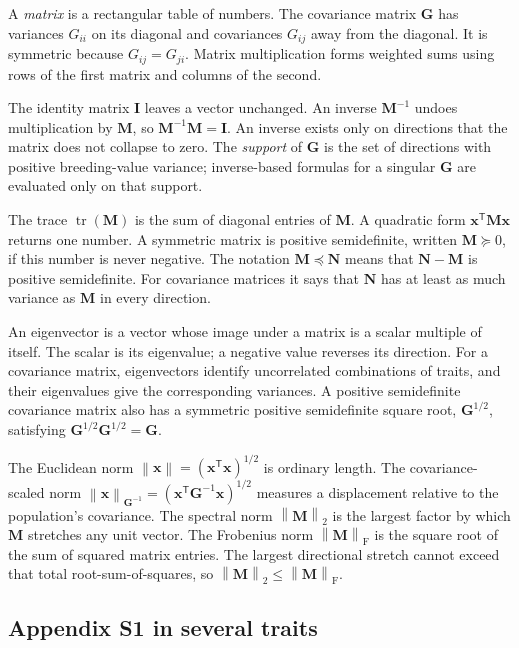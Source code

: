 \documentclass[11pt]{article}
\newcommand{\vect}[1]{\boldsymbol{#1}}
\newcommand{\mat}[1]{\mathbf{#1}}
\newcommand{\tr}{\operatorname{tr}}
\newcommand{\norm}[1]{\left\lVert#1\right\rVert}
\begin{document}
A \emph{matrix} is a rectangular table of numbers.  The covariance matrix
$\mat G$ has variances $G_{ii}$ on its diagonal and covariances $G_{ij}$ away
from the diagonal.  It is symmetric because $G_{ij}=G_{ji}$.  Matrix
multiplication forms weighted sums using rows of the first matrix and columns
of the second.

The identity matrix $\mat I$ leaves a vector unchanged.  An inverse
$\mat M^{-1}$ undoes multiplication by $\mat M$, so
$\mat M^{-1}\mat M=\mat I$.  An inverse exists only on directions that the
matrix does not collapse to zero.  The \emph{support} of $\mat G$ is the set
of directions with positive breeding-value variance; inverse-based formulas
for a singular $\mat G$ are evaluated only on that support.

The trace $\tr(\mat M)$ is the sum of diagonal entries of $\mat M$.  A
quadratic form $\vect x^{\mathsf T}\mat M\vect x$ returns one number.  A
symmetric matrix is positive semidefinite, written $\mat M\succeq0$, if this
number is never negative.  The notation $\mat M\preceq\mat N$ means that
$\mat N-\mat M$ is positive semidefinite.  For covariance matrices it says
that $\mat N$ has at least as much variance as $\mat M$ in every direction.

An eigenvector is a vector whose image under a matrix is a scalar multiple of itself. The scalar is its eigenvalue; a negative value reverses its direction. For a covariance matrix, eigenvectors identify uncorrelated combinations of traits, and their eigenvalues give the corresponding variances. A positive semidefinite covariance matrix also has a symmetric positive semidefinite square root, $\mat G^{1/2}$, satisfying $\mat G^{1/2}\mat G^{1/2}=\mat G$.

The Euclidean norm $\norm{\vect x}=(\vect x^{\mathsf T}\vect x)^{1/2}$ is
ordinary length.  The covariance-scaled norm
$\norm{\vect x}_{\mat G^{-1}}=(\vect x^{\mathsf T}\mat G^{-1}\vect x)^{1/2}$
measures a displacement relative to the population's covariance.  The
spectral norm $\norm{\mat M}_2$ is the largest factor by which $\mat M$
stretches any unit vector.  The Frobenius norm
$\norm{\mat M}_{\mathrm F}$ is the square root of the sum of squared matrix
entries.  The largest directional stretch cannot exceed that total
root-sum-of-squares, so $\norm{\mat M}_2\leq\norm{\mat M}_{\mathrm F}$.

\subsection{Appendix S1 in several traits}
\label{sec:multi-s1}
\end{document}
